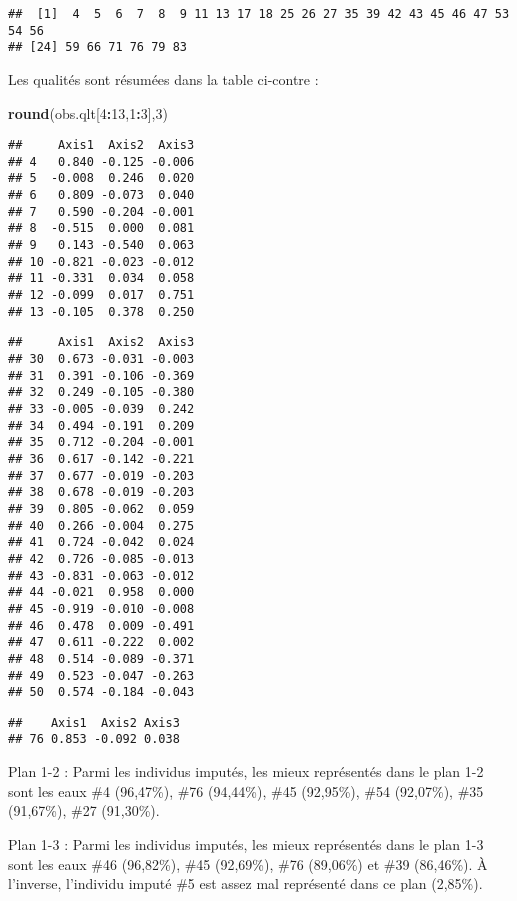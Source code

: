 \documentclass[]{article}
\newenvironment{Shaded}{\begin{snugshade}}{\end{snugshade}}
\newcommand{\KeywordTok}[1]{\textcolor[rgb]{0.13,0.29,0.53}{\textbf{#1}}}
\newcommand{\DecValTok}[1]{\textcolor[rgb]{0.00,0.00,0.81}{#1}}
\newcommand{\OperatorTok}[1]{\textcolor[rgb]{0.81,0.36,0.00}{\textbf{#1}}}
\newcommand{\NormalTok}[1]{#1}
\begin{document}
\begin{verbatim}
##  [1]  4  5  6  7  8  9 11 13 17 18 25 26 27 35 39 42 43 45 46 47 53 54 56
## [24] 59 66 71 76 79 83
\end{verbatim}

Les qualités sont résumées dans la table ci-contre :

\begin{Shaded}
\begin{Highlighting}[]
\KeywordTok{round}\NormalTok{(obs.qlt[}\DecValTok{4}\OperatorTok{:}\DecValTok{13}\NormalTok{,}\DecValTok{1}\OperatorTok{:}\DecValTok{3}\NormalTok{],}\DecValTok{3}\NormalTok{)}
\end{Highlighting}
\end{Shaded}

\begin{verbatim}
##     Axis1  Axis2  Axis3
## 4   0.840 -0.125 -0.006
## 5  -0.008  0.246  0.020
## 6   0.809 -0.073  0.040
## 7   0.590 -0.204 -0.001
## 8  -0.515  0.000  0.081
## 9   0.143 -0.540  0.063
## 10 -0.821 -0.023 -0.012
## 11 -0.331  0.034  0.058
## 12 -0.099  0.017  0.751
## 13 -0.105  0.378  0.250
\end{verbatim}

\begin{verbatim}
##     Axis1  Axis2  Axis3
## 30  0.673 -0.031 -0.003
## 31  0.391 -0.106 -0.369
## 32  0.249 -0.105 -0.380
## 33 -0.005 -0.039  0.242
## 34  0.494 -0.191  0.209
## 35  0.712 -0.204 -0.001
## 36  0.617 -0.142 -0.221
## 37  0.677 -0.019 -0.203
## 38  0.678 -0.019 -0.203
## 39  0.805 -0.062  0.059
## 40  0.266 -0.004  0.275
## 41  0.724 -0.042  0.024
## 42  0.726 -0.085 -0.013
## 43 -0.831 -0.063 -0.012
## 44 -0.021  0.958  0.000
## 45 -0.919 -0.010 -0.008
## 46  0.478  0.009 -0.491
## 47  0.611 -0.222  0.002
## 48  0.514 -0.089 -0.371
## 49  0.523 -0.047 -0.263
## 50  0.574 -0.184 -0.043
\end{verbatim}

\begin{verbatim}
##    Axis1  Axis2 Axis3
## 76 0.853 -0.092 0.038
\end{verbatim}

Plan 1-2 : Parmi les individus imputés, les mieux représentés dans le
plan 1-2 sont les eaux \#4 (96,47\%), \#76 (94,44\%), \#45 (92,95\%),
\#54 (92,07\%), \#35 (91,67\%), \#27 (91,30\%).

Plan 1-3 : Parmi les individus imputés, les mieux représentés dans le
plan 1-3 sont les eaux \#46 (96,82\%), \#45 (92,69\%), \#76 (89,06\%) et
\#39 (86,46\%). À l'inverse, l'individu imputé \#5 est assez mal
représenté dans ce plan (2,85\%).
\end{document}
